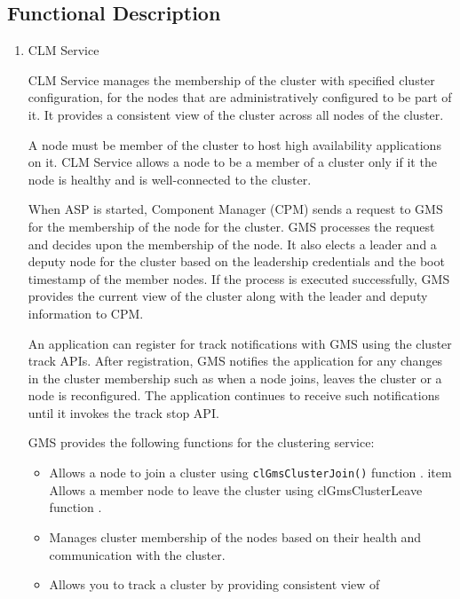 \begin{flushleft}
\section{Functional Description}
\begin{enumerate}
\item \begin{bf}CLM Service \end{bf}
\newline
CLM Service manages the membership of the cluster with specified
cluster configuration, for the nodes that are administratively
configured to be part of it. It provides a consistent view of the
cluster across all nodes of the cluster.
\newline
\par
A node must be member of the cluster to host high availability
applications on it. CLM Service allows a node to be a member of a
cluster only if it the node is healthy and is well-connected to the
cluster.
\newline
\par
When ASP is started, Component Manager (CPM) sends a request to GMS
for the membership of the node for the cluster. GMS processes the
request and decides upon the membership of the node. It also elects
a leader and a deputy node for the cluster based on the leadership
credentials and the boot timestamp of the member nodes. If the
process is executed successfully, GMS provides the current view of
the cluster along with the leader and deputy information to CPM.
\newline
\par
An application can register for track notifications with GMS using
the cluster track APIs. After registration, GMS notifies the
application for any changes in the cluster membership such as when a
node joins, leaves the cluster or a node is reconfigured. The
application continues to receive such notifications until it invokes
the track stop API.
\newline
\par
GMS provides the following functions for the clustering service:
\begin{itemize}
\item Allows a node to join a cluster using {\tt{clGmsClusterJoin()}} function .
item Allows a member node to leave the cluster using
clGmsClusterLeave function .
\item Manages cluster membership of the nodes based on their health and communication with the cluster.
\item Allows you to track a cluster by providing consistent view of

\end{itemize}
\end{enumerate}
\end{flushleft}
